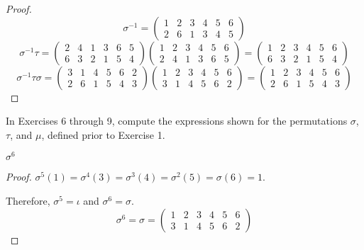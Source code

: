 \begin{proof}
    \[
        {\sigma}^{-1} =
        \begin{pmatrix}
            1 & 2 & 3 & 4 & 5 & 6 \\
            2 & 6 & 1 & 3 & 4 & 5
        \end{pmatrix}
    \]
    \[
        {\sigma}^{-1}\tau =
        \begin{pmatrix}
            2 & 4 & 1 & 3 & 6 & 5 \\
            6 & 3 & 2 & 1 & 5 & 4
        \end{pmatrix}
        \begin{pmatrix}
            1 & 2 & 3 & 4 & 5 & 6 \\
            2 & 4 & 1 & 3 & 6 & 5
        \end{pmatrix} =
        \begin{pmatrix}
            1 & 2 & 3 & 4 & 5 & 6 \\
            6 & 3 & 2 & 1 & 5 & 4
        \end{pmatrix}
    \]
    \[
        {\sigma}^{-1}\tau{\sigma} =
        \begin{pmatrix}
            3 & 1 & 4 & 5 & 6 & 2 \\
            2 & 6 & 1 & 5 & 4 & 3
        \end{pmatrix}
        \begin{pmatrix}
            1 & 2 & 3 & 4 & 5 & 6 \\
            3 & 1 & 4 & 5 & 6 & 2
        \end{pmatrix} =
        \begin{pmatrix}
            1 & 2 & 3 & 4 & 5 & 6 \\
            2 & 6 & 1 & 5 & 4 & 3
        \end{pmatrix}
    \]
\end{proof}

In Exercises 6 through 9, compute the expressions shown for the permutations $\sigma$, $\tau$, and $\mu$, defined prior to Exercise 1.

\begin{exercise}
    $\sigma^{6}$
\end{exercise}

\begin{proof}
    $\sigma^{5}(1) = \sigma^{4}(3) = \sigma^{3}(4) = \sigma^{2}(5) = \sigma(6) = 1$.

    Therefore, $\sigma^{5} = \iota$ and $\sigma^{6} = \sigma$.
    \[
        \sigma^{6} = \sigma =
        \begin{pmatrix}
            1 & 2 & 3 & 4 & 5 & 6 \\
            3 & 1 & 4 & 5 & 6 & 2
        \end{pmatrix}
    \]
\end{proof}

